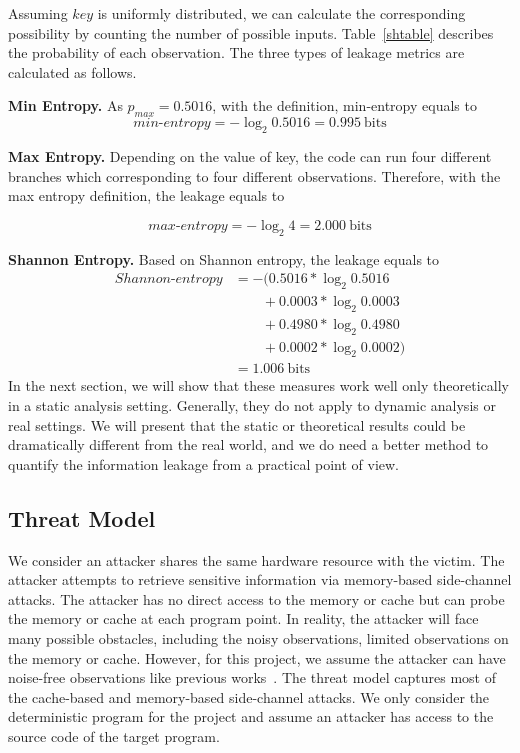 Assuming $\mathit{key}$ is uniformly distributed, we can calculate the corresponding
possibility by counting the number of possible inputs. Table~\ref{shtable}
describes the probability of each observation. The three types of leakage metrics are
calculated as follows.

\vspace{3pt}
\textbf{Min Entropy.}
As $p_{\mathit{max}} = 0.5016$, with the definition, min-entropy equals to
\begin{displaymath}
    \mathit{min\text{-}entropy} = -\log_2{0.5016} = 0.995\ \mathrm{bits}
\end{displaymath}

\textbf{Max Entropy.}
Depending on the value of key, the code can run four different branches which
corresponding to four different observations. Therefore, with the max entropy
definition, the leakage equals to

\begin{displaymath}
    \mathit{max\text{-}entropy} = -\log_2{4} = 2.000\ \mathrm{bits}
\end{displaymath}

\vspace{3pt}
\textbf{Shannon Entropy.}
Based on Shannon entropy, the leakage equals to
{\footnotesize
\begin{align*}
    \mathit{Shannon\text{-}entropy} & = -(0.5016*\log_{2}0.5016      \\
                                    & \qquad+ 0.0003*\log_{2}0.0003  \\
                                    & \qquad+ 0.4980*\log_{2}0.4980  \\
                                    & \qquad+ 0.0002*\log_{2}0.0002) \\
                                    & = 1.006\ \mathrm{bits}
\end{align*}
}
In the next section, we will show that these measures work well only
theoretically in a static analysis setting. 
Generally, they do not apply to dynamic analysis or real
settings. We will present that the static or theoretical results could be
dramatically different from the real world, and we do need a better method to
quantify the information leakage from a practical point of view.

\subsection{Threat Model}
We consider an attacker shares the same hardware resource with the victim.
The attacker attempts to retrieve sensitive information via memory-based
side-channel attacks. The attacker has no direct access to the memory or cache
but can probe the memory or cache at each program point. In reality, the
attacker will face many possible obstacles, including the noisy observations,
limited observations on the memory or cache. However, for this project, we assume
the attacker can have noise-free observations like previous works~\cite{203878,182946,Brotzman19Casym}. 
The threat model captures most of the cache-based and memory-based side-channel attacks. 
We only consider the deterministic program for the project and assume an attacker 
has access to the source code of the target program.
